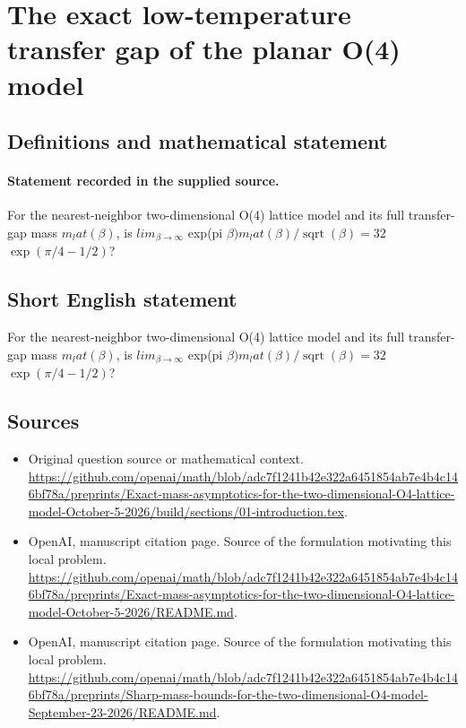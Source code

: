 \documentclass[11pt]{article}
\begin{document}
\section*{The exact low-temperature transfer gap of the planar O(4) model}\label{30007379}
\subsection{Definitions and mathematical statement}
\paragraph{Statement recorded in the supplied source.}
For the nearest-neighbor two-dimensional O(4) lattice model and its full transfer-gap mass $m_lat(\beta )$, is $lim_{\beta \to \infty }$ exp(pi $\beta )m_lat(\beta )/\operatorname{sqrt}(\beta )=32$ $\exp (\pi /4-1/2)$?
\subsection{Short English statement}
For the nearest-neighbor two-dimensional O(4) lattice model and its full transfer-gap mass $m_lat(\beta )$, is $lim_{\beta \to \infty }$ exp(pi $\beta )m_lat(\beta )/\operatorname{sqrt}(\beta )=32$ $\exp (\pi /4-1/2)$?
\subsection{Sources}
\begin{itemize}
\item[S1] Original question source or mathematical context.
\url{https://github.com/openai/math/blob/adc7f1241b42e322a6451854ab7e4b4c146bf78a/preprints/Exact-mass-asymptotics-for-the-two-dimensional-O4-lattice-model-October-5-2026/build/sections/01-introduction.tex}.
\item[S2] OpenAI, manuscript citation page. Source of the formulation motivating this local problem.
\url{https://github.com/openai/math/blob/adc7f1241b42e322a6451854ab7e4b4c146bf78a/preprints/Exact-mass-asymptotics-for-the-two-dimensional-O4-lattice-model-October-5-2026/README.md}.
\item[S3] OpenAI, manuscript citation page. Source of the formulation motivating this local problem.
\url{https://github.com/openai/math/blob/adc7f1241b42e322a6451854ab7e4b4c146bf78a/preprints/Sharp-mass-bounds-for-the-two-dimensional-O4-model-September-23-2026/README.md}.
\end{itemize}
\end{document}
